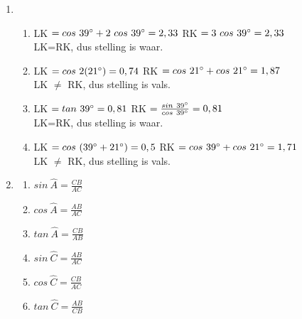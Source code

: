 \begin{solutions}{}
{\begin{enumerate}[itemsep=5pt, label=\textbf{\arabic*}. ]
\begin{multicols}{2}
\end{multicols}
\item %
\begin{enumerate}[noitemsep, label=\textbf{(\alph*)} ]
\item %
    LK $= cos~39^{\circ} + 2~cos~39^{\circ}\\
	 = 2,33 \\$
    RK $= 3~cos~39^{\circ}\\
	= 2,33$ \\
LK=RK, dus stelling is waar.
\item %
    LK $= cos~2(21^{\circ})\\
	 = 0,74 \\$
    RK $= cos~21^{\circ}+cos~21^{\circ}\\
	= 1,87$ \\
LK $\ne$ RK, dus stelling is vals.
\item %
    LK $= tan~39^{\circ}\\
	 = 0,81 \\$
    RK $= \frac{sin~39^{\circ}}{cos~39^{\circ}}\\
	= 0,81$ \\
LK=RK, dus stelling is waar.
\item %
LK $= cos~(39^{\circ}+21^{\circ})\\
	 = 0,5 \\$
    RK $= cos~39^{\circ}+cos~21^{\circ}\\
	= 1,71$ \\
LK $\ne$ RK, dus stelling is vals.
\end{enumerate}

\item %
\begin{multicols}{2}
\begin{enumerate}[itemsep=1pt, label=\textbf{(\alph*)} ]
\item $sin~\hat{A} = \frac{CB}{AC}$
\item $cos~\hat{A} = \frac{AB}{AC}$%
\item $tan~\hat{A} = \frac{CB}{AB}$%
\item $sin~\hat{C} = \frac{AB}{AC}$%
\item $cos~\hat{C} = \frac{CB}{AC}$%
\item $tan~\hat{C} = \frac{AB}{CB}$%
\end{enumerate}


\end{multicols}
\end{enumerate}}
\end{solutions}
